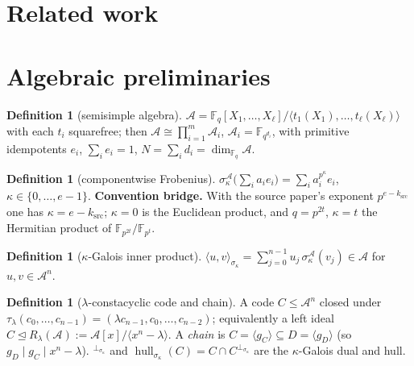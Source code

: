\documentclass[11pt]{article}
\theoremstyle{definition}
\newtheorem{definition}[theorem]{Definition}
\theoremstyle{remark}
\theoremstyle{plain}
\newcommand{\Fq}{\mathbb{F}_q}
\newcommand{\Fqi}{\mathbb{F}_{q^{d_i}}}
\newcommand{\Aalg}{\mathcal{A}}
\newcommand{\Rlam}{R_{\lambda}}
\newcommand{\hull}{\operatorname{hull}}
\newcommand{\perpsig}{^{\perp_{\sigma_\kappa}}}
\newcommand{\Sig}{\sigma_\kappa}
\begin{document}
\section{Related work}\label{sec:related}
\section{Algebraic preliminaries}\label{sec:prelim}

\begin{definition}[semisimple algebra]\label{def:A}
$\Aalg=\Fq[X_1,\dots,X_\ell]/\langle t_1(X_1),\dots,t_\ell(X_\ell)\rangle$ with each $t_i$
squarefree; then $\Aalg\cong\prod_{i=1}^{m}\Aalg_i$, $\Aalg_i=\Fqi$, with primitive
idempotents $e_i$, $\sum_ie_i=1$, $N=\sum_i d_i=\dim_{\Fq}\Aalg$.
\end{definition}

\begin{definition}[componentwise Frobenius]\label{def:frob}
$\Sig^{\Aalg}\big(\sum_i a_ie_i\big)=\sum_i a_i^{p^\kappa}e_i$, $\kappa\in\{0,\dots,e-1\}$.
\textbf{Convention bridge.} With the source paper's exponent $p^{e-k_{\mathrm{src}}}$ one has
$\kappa=e-k_{\mathrm{src}}$; $\kappa=0$ is the Euclidean product, and $q=p^{2t}$, $\kappa=t$ the
Hermitian product of $\mathbb{F}_{p^{2t}}/\mathbb{F}_{p^t}$.
\end{definition}

\begin{definition}[$\kappa$-Galois inner product]\label{def:ip}
$\langle u,v\rangle_{\Sig}=\sum_{j=0}^{n-1}u_j\,\Sig^{\Aalg}(v_j)\in\Aalg$ for
$u,v\in\Aalg^n$.
\end{definition}

\begin{definition}[$\lambda$-constacyclic code and chain]\label{def:code}
A code $C\le\Aalg^n$ closed under
$\tau_\lambda(c_0,\dots,c_{n-1})=(\lambda c_{n-1},c_0,\dots,c_{n-2})$; equivalently a left ideal
$C\trianglelefteq\Rlam(\Aalg):=\Aalg[x]/\langle x^n-\lambda\rangle$. A \emph{chain} is
$C=\langle g_C\rangle\subseteq D=\langle g_D\rangle$ (so $g_D\mid g_C\mid x^n-\lambda$).
$\perpsig$ and $\hull_{\Sig}(C)=C\cap C\perpsig$ are the $\kappa$-Galois dual and hull.
\end{definition}
\end{document}
